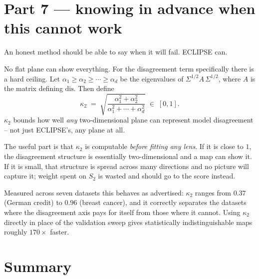 \documentclass[11pt]{article}
\begin{document}
\section{Part 7 --- knowing in advance when this cannot work}

An honest method should be able to say when it will fail. ECLIPSE can.

No flat plane can show everything. For the disagreement term specifically there is a
hard ceiling. Let $\alpha_1 \ge \alpha_2 \ge \cdots \ge \alpha_d$ be the eigenvalues of
$\Sigma^{1/2} A\, \Sigma^{1/2}$, where $A$ is the matrix defining $\mathrm{dis}$. Then
define
\[
  \kappa_2 \;=\; \sqrt{ \frac{\alpha_1^2 + \alpha_2^2}
                             {\alpha_1^2 + \cdots + \alpha_d^2} } \;\in\; [0, 1].
\]
$\kappa_2$ bounds how well \emph{any} two-dimensional plane can represent model
disagreement -- not just ECLIPSE's, any plane at all.

The useful part is that $\kappa_2$ is computable \emph{before fitting any lens}. If it
is close to $1$, the disagreement structure is essentially two-dimensional and a map
can show it. If it is small, that structure is spread across many directions and no
picture will capture it; weight spent on $S_2$ is wasted and should go to the score
instead.

Measured across seven datasets this behaves as advertised: $\kappa_2$ ranges from
$0.37$ (German credit) to $0.96$ (breast cancer), and it correctly separates the
datasets where the disagreement axis pays for itself from those where it cannot.
Using $\kappa_2$ directly in place of the validation sweep gives statistically
indistinguishable maps roughly $170\times$ faster.

\section{Summary}
\end{document}
